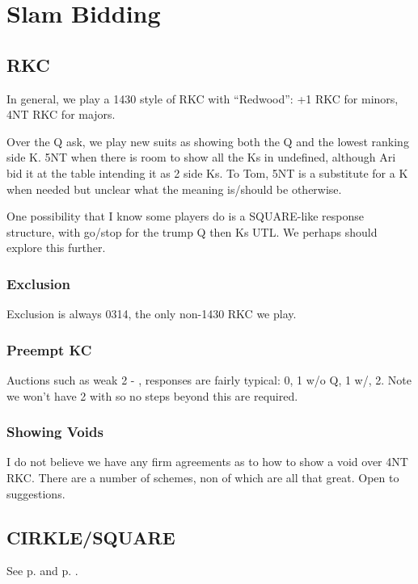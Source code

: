 \documentclass[tom-ari]{subfile}
\begin{document}
\chapter{Slam Bidding}

\section{RKC}

In general, we play a 1430 style of RKC with ``Redwood'':  +1 RKC for minors, 4NT RKC for majors.

Over the Q ask, we play new suits as showing both the Q and the lowest ranking side K.  5NT when there is room to show all the Ks in undefined, although Ari bid it at the table intending it as 2 side Ks.  To Tom, 5NT is a substitute for a K when needed but unclear what the meaning is/should be otherwise.


One possibility that I know some players do is a SQUARE-like response structure, with go/stop for the trump Q then Ks UTL. We perhaps should explore this further.

\subsection{Exclusion}

Exclusion is always 0314, the only non-1430 RKC we play.

\subsection{Preempt KC}

Auctions such as weak 2 - , responses are fairly typical:  0, 1 w/o Q, 1 w/, 2.  Note we won't have 2 with so no steps beyond this are required.

\subsection{Showing Voids}

I do not believe we have any firm agreements as to how to show a void over 4NT RKC.  There are a number of schemes, non of which are all that great.  Open to suggestions.

\section{CIRKLE/SQUARE}

See p. \pageref{CIRKLE} and p. \pageref{SQUARE}.
\end{document}

